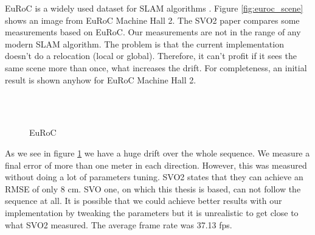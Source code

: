 \documentclass[11pt,a4paper,titlepage,oneside]{report}
\begin{document}
EuRoC is a widely used dataset for SLAM algorithms \cite{euroc}. Figure \ref{fig:euroc_scene} shows an image from EuRoC Machine Hall 2. The SVO2 paper \cite{svo2} compares some measurements based on EuRoC. Our measurements are not in the range of any modern SLAM algorithm. The problem is that the current implementation doesn't do a relocation (local or global). Therefore, it can't profit if it sees the same scene more than once, what increases the drift. For completeness, an initial result is shown anyhow for EuRoC Machine Hall 2.

\begin{figure}[H]
  \\
  \\
  \caption{EuRoC }\label{fig:euroc}
\end{figure}

As we see in figure \ref{fig:euroc} we have a huge drift over the whole sequence. We measure a final error of more than one meter in each direction. However, this was measured without doing a lot of parameters tuning. SVO2 states that they can achieve an RMSE of only 8 cm. SVO one, on which this thesis is based, can not follow the sequence at all. It is possible that we could achieve better results with our implementation by tweaking the parameters but it is unrealistic to get close to what SVO2 measured. The average frame rate was 37.13 fps.
\end{document}
